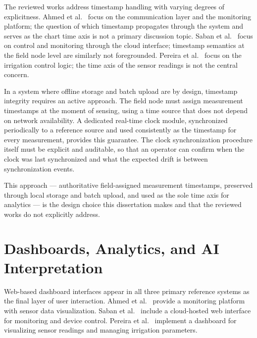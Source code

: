 The reviewed works address timestamp handling with varying degrees of
explicitness. Ahmed et al.~\cite{ahmed2022lora_agriculture_chile} focus on the
communication layer and the monitoring platform; the question of which
timestamp propagates through the system and serves as the chart time axis is
not a primary discussion topic. Saban et
al.~\cite{saban2023smart_agricultural_lora_cloud} focus on control and
monitoring through the cloud interface; timestamp semantics at the field node
level are similarly not foregrounded. Pereira et
al.~\cite{pereira2023esp32_drip_irrigation} focus on the irrigation control
logic; the time axis of the sensor readings is not the central concern.

In a system where offline storage and batch upload are by design, timestamp
integrity requires an active approach. The field node must assign measurement
timestamps at the moment of sensing, using a time source that does not depend
on network availability. A dedicated real-time clock module, synchronized
periodically to a reference source and used consistently as the timestamp for
every measurement, provides this guarantee. The clock synchronization
procedure itself must be explicit and auditable, so that an operator can
confirm when the clock was last synchronized and what the expected drift is
between synchronization events.

This approach --- authoritative field-assigned measurement timestamps,
preserved through local storage and batch upload, and used as the sole time
axis for analytics --- is the design choice this dissertation makes and that
the reviewed works do not explicitly address.

\section{Dashboards, Analytics, and AI Interpretation}
\label{sec:dashboards-analytics-ai}

Web-based dashboard interfaces appear in all three primary reference systems
as the final layer of user interaction. Ahmed et
al.~\cite{ahmed2022lora_agriculture_chile} provide a monitoring platform with
sensor data visualization. Saban et
al.~\cite{saban2023smart_agricultural_lora_cloud} include a cloud-hosted web
interface for monitoring and device control. Pereira et
al.~\cite{pereira2023esp32_drip_irrigation} implement a dashboard for
visualizing sensor readings and managing irrigation parameters.

